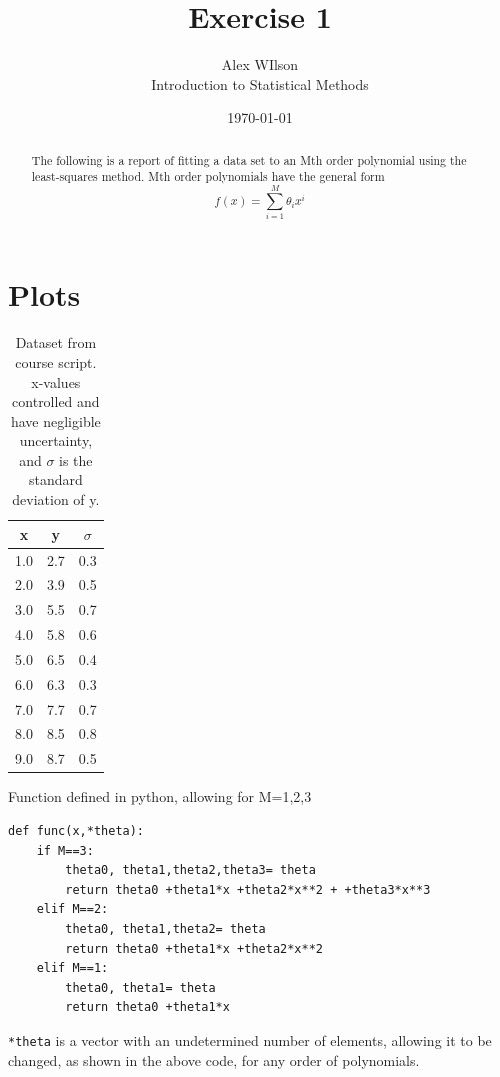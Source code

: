 \documentclass[10pt, twocolumn, twoside]{article}
\author{Alex WIlson\\Introduction to Statistical Methods}
\title{Exercise 1}
\date{\today}
\begin{document}
\maketitle %

\begin{abstract}
The following is a report of fitting a data set to an Mth order polynomial using the least-squares method. Mth order polynomials have the general form
\begin{equation}
    f\left( x \right)=\sum_{i=1}^{M}\theta_{i}x^{i}
\end{equation}
\end{abstract}

\section{Plots}

\begin{table}[H]
\label{tab:data}
    \centering
    \begin{tabular}{|c|c|c|}
        \hline
        x &  y & $\sigma$ \\
        \hline
	    1.0	&	2.7 & 0.3	\\
	    2.0	&	3.9 & 0.5	\\
	    3.0	&	5.5 & 0.7	\\
	    4.0	&	5.8 & 0.6	\\
	    5.0	&	6.5 & 0.4	\\
	    6.0	&	6.3 & 0.3	\\
	    7.0	&	7.7 & 0.7	\\
	    8.0	&	8.5 & 0.8	\\
	    9.0 &   8.7 & 0.5   \\
        
        \hline
    \end{tabular}
    \caption{Dataset from course script\cite{script}. x-values controlled and have negligible uncertainty, and $\sigma$ is the standard deviation of y.}
    \label{tab:tabl}
\end{table}
Function defined in python, allowing for M=1,2,3

\begin{lstlisting}
def func(x,*theta):
    if M==3:
        theta0, theta1,theta2,theta3= theta
        return theta0 +theta1*x +theta2*x**2 + +theta3*x**3
    elif M==2:
        theta0, theta1,theta2= theta
        return theta0 +theta1*x +theta2*x**2
    elif M==1:
        theta0, theta1= theta
        return theta0 +theta1*x
\end{lstlisting}
\lstinline$*theta$ is a vector with an undetermined number of elements, allowing it to be changed, as shown in the above code, for any order of polynomials.
\end{document}

